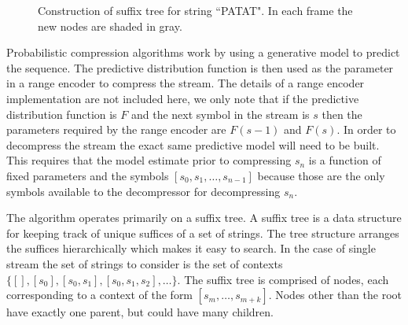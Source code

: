 \newcommand{\T}{\ensuremath{\mathcal{T}}}
\newcommand{\N}{\ensuremath{\mathcal{N}}}
\newcommand{\M}{\ensuremath{\mathcal{M}}}
\newcommand{\PP}{\ensuremath{\mathcal{P}}}
\newcommand{\nc}{\ensuremath{nc}}
\newcommand{\RS}{\ensuremath{\mathcal{R}\mathcal{S}}}
\newcommand{\D}{\ensuremath{\mathcal{D}}}

\begin{figure}[t] 
	\begin{center}
		\caption{Construction of suffix tree for string ``PATAT".  In each frame the new nodes are shaded in gray.}
		\label{fig:suffix_tree}
	\end{center} 
\end{figure} 

Probabilistic compression algorithms work by using a generative model to predict the sequence.  The predictive distribution function is then used as the parameter in a range encoder to compress the stream.  The details of a range encoder implementation are not included here, we only note that if the predictive distribution function is $F$ and the next symbol in the stream is $s$ then the parameters required by the range encoder are $F(s-1)$ and $F(s)$.  In order to decompress the stream the exact same predictive model will need to be built.  This requires that the model estimate prior to compressing $s_n$ is a function of fixed parameters and the symbols $[s_0, s_1, \ldots, s_{n-1}]$ because those are the only symbols available to the decompressor for decompressing $s_n$.  

The algorithm operates primarily on a suffix tree.  A suffix tree is a data structure for keeping track of unique suffices of a set of strings.  The tree structure arranges the suffices hierarchically which makes it easy to search.  In the case of single stream the set of strings to consider is the set of contexts $\{ [ ], [s_0], [s_0,s_1], [s_0, s_1,s_2], \ldots \}$.  The suffix tree is comprised of nodes, each corresponding to a context of the form $[s_m, \ldots, s_{m + k}]$.  Nodes other than the root have exactly one parent, but could have many children.  

